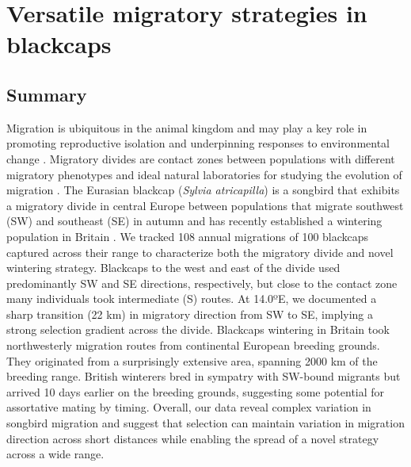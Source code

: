 \documentclass[a4paper, nobind]{templates/ociamthesis}
\begin{document}
\hypertarget{blackcap-geo}{%
\chapter{Versatile migratory strategies in blackcaps}\label{blackcap-geo}}

\hypertarget{summary}{%
\section{Summary}\label{summary}}

Migration is ubiquitous in the animal kingdom and may play a key role in promoting reproductive isolation \autocite{helbigSESWmigratingBlackcap1991,benschMorphologicalMolecularVariation1999,bearhopAssortativeMatingMechanism2005,irwinSiberianMigratoryDivides2005} and underpinning responses to environmental change \autocite{bertholdRapidMicroevolutionMigratory1992,plummerSupplementaryFeedingGardens2015}.
Migratory divides are contact zones between populations with different migratory phenotypes and ideal natural laboratories for studying the evolution of migration \autocite{delmoreGeneticsSeasonalMigration2016,delmoreHybridSongbirdsEmploy2014}.
The Eurasian blackcap (\emph{Sylvia atricapilla}) is a songbird that exhibits a migratory divide in central Europe between populations that migrate southwest (SW) and southeast (SE) in autumn \autocite{helbigInheritanceMigratoryDirection1991,helbigPopulationDifferentiationMigratory1992,helbigSESWmigratingBlackcap1991} and has recently established a wintering population in Britain \autocite{leachWinteringBlackcapsBritain1981,bertholdMigratoryBehaviourPopulation1988,bertholdRapidMicroevolutionMigratory1992,bearhopAssortativeMatingMechanism2005}. We tracked 108 annual migrations of 100 blackcaps captured across their range to characterize both the migratory divide and novel wintering strategy.
Blackcaps to the west and east of the divide used predominantly SW and SE directions, respectively, but close to the contact zone many individuals took intermediate (S) routes. At 14.0ºE, we documented a sharp transition (22 km) in migratory direction from SW to SE, implying a strong selection gradient across the divide.
Blackcaps wintering in Britain took northwesterly migration routes from continental European breeding grounds. They originated from a surprisingly extensive area, spanning 2000 km of the breeding range. British winterers bred in sympatry with SW-bound migrants but arrived 10 days earlier on the breeding grounds, suggesting some potential for assortative mating by timing.
Overall, our data reveal complex variation in songbird migration and suggest that selection can maintain variation in migration direction across short distances while enabling the spread of a novel strategy across a wide range.
\end{document}
